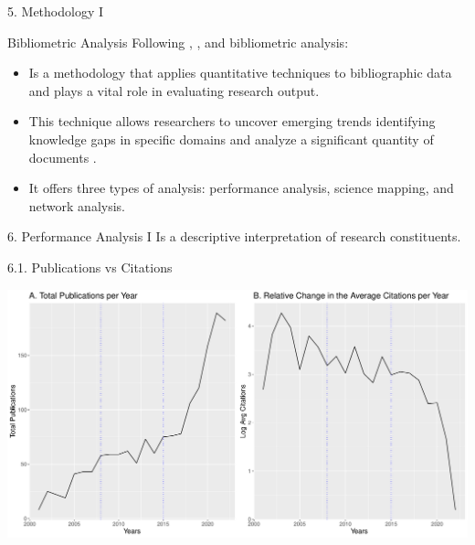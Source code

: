 \documentclass[
  ignorenonframetext,
]{beamer}
\providecommand{\tightlist}{%
  \setlength{\itemsep}{0pt}\setlength{\parskip}{0pt}}
\begin{document}
\begin{frame}{5. Methodology I}
\protect\hypertarget{methodology-i}{}
\begin{block}{Bibliometric Analysis}
\protect\hypertarget{bibliometric-analysis}{}
Following \citet{donthu2021}, \citet{Aria2017}, \citet{ellegaard2015}
and \citet{Bornmann2015} bibliometric analysis:

\begin{itemize}
\tightlist
\item
  Is a methodology that applies quantitative techniques to bibliographic
  data and plays a vital role in evaluating research output.
\item
  This technique allows researchers to uncover emerging trends
  identifying knowledge gaps in specific domains and analyze a
  significant quantity of documents .
\item
  It offers three types of analysis: performance analysis, science
  mapping, and network analysis.
\end{itemize}
\end{block}
\end{frame}

\begin{frame}{6. Performance Analysis I}
\protect\hypertarget{performance-analysis-i}{}
Is a descriptive interpretation of research constituents.

\begin{block}{6.1. Publications vs Citations}
\protect\hypertarget{publications-vs-citations}{}
\vspace{0.5cm}

\includegraphics{Presentation_bibliometric_Urbino_may_23_files/figure-beamer/Panel cite vs prod-1.pdf}
\end{block}
\end{frame}
\end{document}
